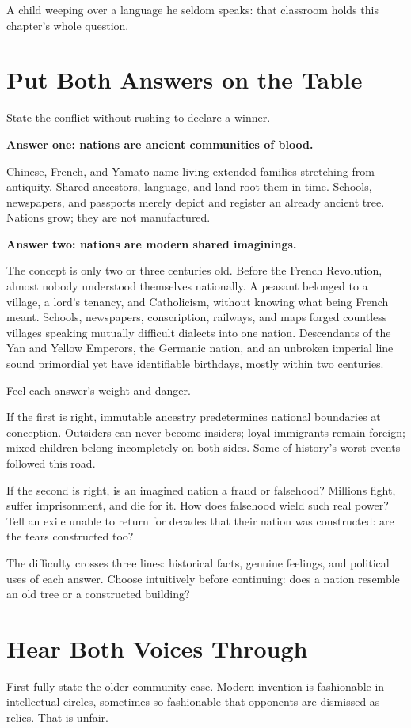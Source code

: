A child weeping over a language he seldom speaks: that classroom holds this chapter's whole question.

\section{Put Both Answers on the Table}
State the conflict without rushing to declare a winner.

\textbf{Answer one: nations are ancient communities of blood.}

Chinese, French, and Yamato name living extended families stretching from antiquity. Shared ancestors, language, and land root them in time. Schools, newspapers, and passports merely depict and register an already ancient tree. Nations grow; they are not manufactured.

\textbf{Answer two: nations are modern shared imaginings.}

The concept is only two or three centuries old. Before the French Revolution, almost nobody understood themselves nationally. A peasant belonged to a village, a lord's tenancy, and Catholicism, without knowing what being French meant. Schools, newspapers, conscription, railways, and maps forged countless villages speaking mutually difficult dialects into one nation. Descendants of the Yan and Yellow Emperors, the Germanic nation, and an unbroken imperial line sound primordial yet have identifiable birthdays, mostly within two centuries.

Feel each answer's weight and danger.

If the first is right, immutable ancestry predetermines national boundaries at conception. Outsiders can never become insiders; loyal immigrants remain foreign; mixed children belong incompletely on both sides. Some of history's worst events followed this road.

If the second is right, is an imagined nation a fraud or falsehood? Millions fight, suffer imprisonment, and die for it. How does falsehood wield such real power? Tell an exile unable to return for decades that their nation was constructed: are the tears constructed too?

The difficulty crosses three lines: historical facts, genuine feelings, and political uses of each answer. Choose intuitively before continuing: does a nation resemble an old tree or a constructed building?

\section{Hear Both Voices Through}
First fully state the older-community case. Modern invention is fashionable in intellectual circles, sometimes so fashionable that opponents are dismissed as relics. That is unfair.

